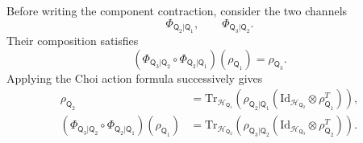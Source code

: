 \documentclass[
    aps,
    pra,
    reprint,
    superscriptaddress,
    nofootinbib
]{revtex4-2}
\theoremstyle{definition}
\theoremstyle{plain}
\begin{document}
Before writing the component contraction, consider the two channels
\begin{equation}
    \Phi_{\mathsf{Q}_{2}|\mathsf{Q}_{1}},
    \qquad
    \Phi_{\mathsf{Q}_{3}|\mathsf{Q}_{2}}.
\end{equation}
Their composition satisfies
\begin{equation}
    \left(
        \Phi_{\mathsf{Q}_{3}|\mathsf{Q}_{2}}
        \circ
        \Phi_{\mathsf{Q}_{2}|\mathsf{Q}_{1}}
    \right)
    \left(\rho_{\mathsf{Q}_{1}}\right)
    =
    \rho_{\mathsf{Q}_{3}}.
\end{equation}
Applying the Choi action formula successively gives
\begin{equation}
\begin{aligned}
\rho_{\mathsf{Q}_{2}}
&=
\mathrm{Tr}_{\mathcal{H}_{\mathsf{Q}_{1}}}
\left(
    \rho_{\mathsf{Q}_{2}|\mathsf{Q}_{1}}
    \left(
        \mathrm{Id}_{\mathcal{H}_{\mathsf{Q}_{2}}}
        \otimes
        \rho_{\mathsf{Q}_{1}}^{T}
    \right)
\right),\\
\left(
    \Phi_{\mathsf{Q}_{3}|\mathsf{Q}_{2}}
    \circ
    \Phi_{\mathsf{Q}_{2}|\mathsf{Q}_{1}}
\right)
\left(\rho_{\mathsf{Q}_{1}}\right)
&=
\mathrm{Tr}_{\mathcal{H}_{\mathsf{Q}_{2}}}
\left(
    \rho_{\mathsf{Q}_{3}|\mathsf{Q}_{2}}
    \left(
        \mathrm{Id}_{\mathcal{H}_{\mathsf{Q}_{3}}}
        \otimes
        \rho_{\mathsf{Q}_{2}}^{T}
    \right)
\right).
\end{aligned}
\label{eq:composition-choi-maps}
\end{equation}
\end{document}

